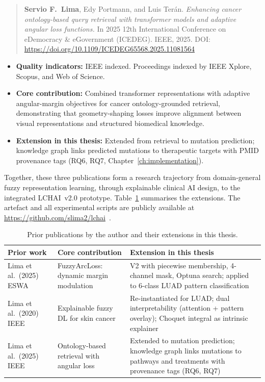\begin{quote}
\textbf{Servio F.\ Lima}, Edy Portmann, and Luis Ter\'{a}n.
\emph{Enhancing cancer ontology-based query retrieval with transformer
models and adaptive angular loss functions.}
In 2025 12th International Conference on eDemocracy \& eGovernment
(ICEDEG). IEEE, 2025.
DOI: \url{https://doi.org/10.1109/ICEDEG65568.2025.11081564}
\end{quote}

\begin{itemize}
    \item \textbf{Quality indicators:} IEEE indexed.
    Proceedings indexed by IEEE Xplore, Scopus, and Web of Science.
    \item \textbf{Core contribution:} Combined transformer
    representations with adaptive angular-margin objectives for cancer
    ontology-grounded retrieval, demonstrating that geometry-shaping
    losses improve alignment between visual representations and
    structured biomedical knowledge.
    \item \textbf{Extension in this thesis:} Extended from retrieval
    to mutation prediction; knowledge graph links predicted mutations
    to therapeutic targets with PMID provenance tags
    (RQ6, RQ7, Chapter~\ref{ch:implementation}).
\end{itemize}

Together, these three publications form a research trajectory from
domain-general fuzzy representation learning, through explainable
clinical AI design, to the integrated LCHAI~v2.0 prototype.
Table~\ref{tab:prior_work_extensions} summarises the extensions.
The artefact and all experimental scripts are publicly available at
\url{https://github.com/slima2/lchai}~\cite{lchai_repo}.

\begin{table}[ht!]
\centering
\small
\caption{Prior publications by the author and their extensions in this
thesis.}
\label{tab:prior_work_extensions}
\begin{tabular}{p{3.8cm} p{3.5cm} p{5.5cm}}
\hline
\textbf{Prior work} & \textbf{Core contribution} &
\textbf{Extension in this thesis} \\
\hline
Lima et al.\ (2025) ESWA~\cite{lima2025fuzzy} &
  FuzzyArcLoss: dynamic margin modulation &
  V2 with piecewise membership, 4-channel mask, Optuna search;
  applied to 6-class LUAD pattern classification \\
Lima et al.\ (2020) IEEE~\cite{lima2020skin} &
  Explainable fuzzy DL for skin cancer &
  Re-instantiated for LUAD; dual interpretability (attention + pattern
  overlay); Choquet integral as intrinsic explainer \\
Lima et al.\ (2025) IEEE~\cite{lima2025enhancing} &
  Ontology-based retrieval with angular loss &
  Extended to mutation prediction; knowledge graph links mutations to
  pathways and treatments with provenance tags (RQ6, RQ7) \\
\hline
\end{tabular}
\end{table}

